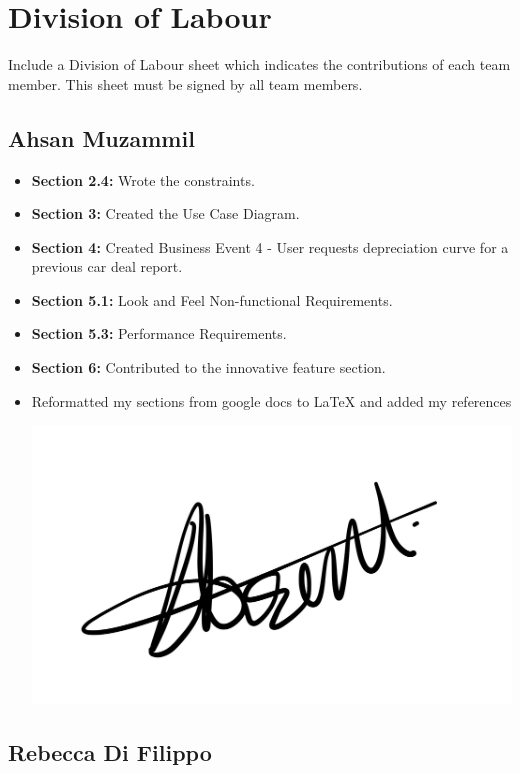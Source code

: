 \documentclass[]{article}
\begin{document}
\appendix
\section{Division of Labour}
\label{sec:division_of_labour}
Include a Division of Labour sheet which indicates the contributions of each team member. This sheet must be signed by all team members.

\subsection{Ahsan Muzammil}

\begin{itemize}
    \item \textbf{Section 2.4:} Wrote the constraints.
    \item \textbf{Section 3:} Created the Use Case Diagram.
    \item \textbf{Section 4:} Created Business Event 4 - User requests depreciation curve for a previous car deal report.
    \item \textbf{Section 5.1:} Look and Feel Non-functional Requirements.
    \item \textbf{Section 5.3:} Performance Requirements.
    \item \textbf{Section 6:} Contributed to the innovative feature section.
    \item Reformatted my sections from google docs to LaTeX and added my references
	\begin{center}
        \includegraphics[scale=0.1]{Images/ahsan.jpeg}
    \end{center}
\end{itemize}

\subsection{Rebecca Di Filippo}
\end{document}
